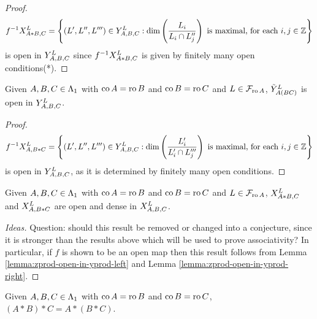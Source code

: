 \documentclass[a4paper, 11pt]{report}
\begin{document}
\begin{proof}
\begin{equation*}
f^{-1}\xprod[L]{A\ast B,C} = \left\{ (L',L'',L''')\in\yprod[L]{A,B,C}: \dim\left(\frac{L_i}{L_i\cap L_j''}\right) \text{ is maximal, for each }i,j\in\integers \right\}
\end{equation*}
is open in $\yprod[L]{A,B,C}$ since $f^{-1}\xprod[L]{A\ast B,C}$ is given by {\color{red}finitely many} open conditions{\color{red}(*)}. 
\end{proof}

\begin{lemma}\label{lemma:zprod-open-in-yprod-right}
Given $A,B,C\in\matrices$ with $\co{A}=\ro{B}$ and $\co{B}=\ro{C}$ and $L\in\flags_{\ro{A}}$, $\zprod[L]{A(BC)}$ is open in $\yprod[L]{A,B,C}$.
\end{lemma}

\begin{proof}
\begin{equation*}
f^{-1}\xprod[L]{A,B\ast C} = \left\{ (L',L'',L''')\in\yprod[L]{A,B,C}: \dim\left(\frac{L_i'}{L_i'\cap L_j'''}\right) \text{ is maximal, for each }i,j\in\integers \right\}
\end{equation*}
is open in $\yprod[L]{A,B,C}$, as it is determined by {\color{red}finitely many} open conditions.
\end{proof}

\begin{lemma}[Conjecture??]\label{lemma:open-embeddings-in-x}
Given $A,B,C\in\matrices$ with $\co{A}=\ro{B}$ and $\co{B}=\ro{C}$ and $L\in\flags_{\ro{A}}$, $\xprod[L]{A\ast B,C}$ and $\xprod[L]{A,B\ast C}$ are open and dense in $\xprod[L]{A,B,C}$.
\end{lemma}

\begin{proof}[Ideas]
Question: should this result be removed or changed into a conjecture, since it is stronger than the results above which will be used to prove associativity? In particular, if $f$ is shown to be an open map then this result follows from Lemma \ref{lemma:zprod-open-in-yprod-left} and Lemma \ref{lemma:zprod-open-in-yprod-right}.
\end{proof}

\begin{proposition}\label{proposition:associativity}
Given $A,B,C\in\matrices$ with $\co{A}=\ro{B}$ and $\co{B}=\ro{C}$, $(A\ast B)\ast C = A\ast (B\ast C)$.
\end{proposition}
\end{document}
